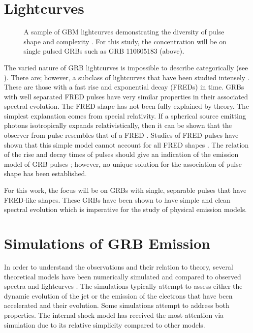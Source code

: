 \section{Lightcurves}

\begin{figure}[h]
  \centering
  \caption{A sample of GBM lightcurves
    demonstrating the diversity of pulse shape and complexity
    \cite{valerieSite}. For this study, the concentration will be on
    single pulsed GRBs such as GRB 110605183 (above).}
  \label{fig:gbmlc}
\end{figure}

The varied nature of GRB lightcurves is impossible to describe
categorically (see ). There are; however, a
subclass of lightcurves that have been studied intensely
\cite{Ruiz:2000,Fenimore:1996,Dermer:2004,Norris:1999}. These are
those with a fast rise and exponential decay (FREDs) in time. GRBs with well
separated FRED pulses have very similar properties in their associated
spectral evolution. The FRED shape has not been fully explained by
theory. The simplest explanation comes from special relativity. If a
spherical source emitting photons isotropically expands
relativistically, then it can be shown that the observer from pulse
resembles that of a FRED \cite{Rees:1966}. Studies of FRED pulses have
shown that this simple model cannot account for all FRED shapes
\cite{Kocevski:2003}. The relation of the rise and decay times of
pulses should give an indication of the emission model of GRB pulses
\cite{Kocevski:2003}; however, no unique solution for the association
of pulse shape has been established.

For this work, the focus will be on GRBs with single, separable pulses
that have FRED-like shapes. These GRBs have been shown to have simple
and clean spectral evolution \cite{Ryde:2009} which is imperative for the study
of physical emission models.

\section{Simulations of GRB Emission}
\label{sec:sims}
In order to understand the observations and their relation to theory,
several theoretical models have been numerically simulated and
compared to observed spectra and lightcurves
\cite{Daigne:1998,Daigne:2009,Asano:2009,Pana:1998,Chiang:1999,Cannizzo:2004,Peer:2005,Kobayashi:1997}. The
simulations typically attempt to assess either the dynamic evolution
of the jet or the emission of the electrons that have been accelerated
and their evolution. Some simulations attempt to address both
properties. The internal shock model has received the most attention
via simulation due to its relative simplicity compared to other
models.

